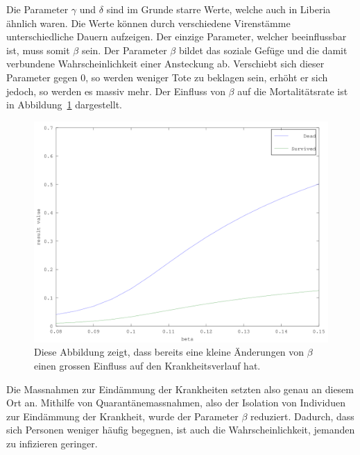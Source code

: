 \begin{refsection}
Die Parameter $\gamma$ und $\delta$ sind im Grunde starre Werte, welche auch in Liberia ähnlich waren. Die Werte können durch verschiedene Virenstämme unterschiedliche Dauern aufzeigen. Der einzige Parameter, welcher beeinflussbar ist, muss somit $\beta$ sein. Der Parameter $\beta$ bildet das soziale Gefüge und die damit verbundene Wahrscheinlichkeit einer Ansteckung ab. Verschiebt sich dieser Parameter gegen 0, so werden weniger Tote zu beklagen sein, erhöht er sich jedoch, so werden es massiv mehr. Der Einfluss von $\beta$ auf die Mortalitätsrate ist in Abbildung~\ref{fig:beta_change_det} dargestellt.

\begin{figure}[ht]
	\centering
	\includegraphics[width=.8\textwidth]{sir/images/beta_change_det}
  \caption[Einfluss von $\beta$ auf die Mortalitätsrate]{Diese Abbildung zeigt, dass bereits eine kleine Änderungen von $\beta$ einen grossen Einfluss auf den Krankheitsverlauf hat.}
  \label{fig:beta_change_det}
\end{figure}

Die Massnahmen zur Eindämmung der Krankheiten setzten also genau an diesem Ort an. Mithilfe von Quarantänemassnahmen, also der Isolation von Individuen zur Eindämmung der Krankheit, wurde der Parameter $\beta$ reduziert. Dadurch, dass sich Personen weniger häufig begegnen, ist auch die Wahrscheinlichkeit, jemanden zu infizieren geringer.


\end{refsection}
